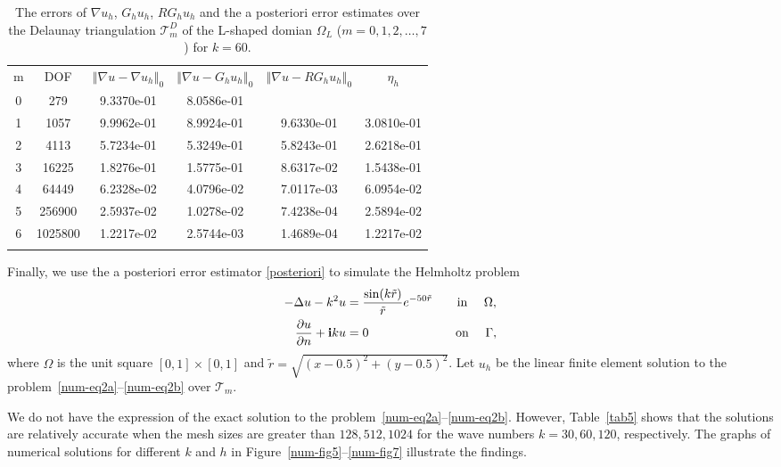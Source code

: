 \documentclass[leqno,final]{siamltex}
\numberwithin{equation}{section}
\newcommand{\norm}[1]{\left\Vert#1\right\Vert}
\newcommand{\De}{\Delta}
\newcommand{\Ga}{\Gamma}
\newcommand{\na}{\nabla}
\newcommand{\Om}{\Omega}
\newcommand{\pa}{\partial}
\renewcommand{\i}{{\rm\mathbf i}}
\newcommand{\T}{\mathcal{T}}
\newcommand{\eq}[1]{\begin{align}#1\end{align}}
\begin{document}
\begin{table}
\begin{center}
\begin{tabular}{|c|c|c|c|c|c|}
\hline\noalign{\smallskip}
m& DOF & $\norm{\na u-\na u_h}_0$ & $\norm{\na u-G_hu_h}_0$ & $\norm{\na u-RG_hu_h}_0$ & $\eta_h$\\
\noalign{\smallskip}\hline\noalign{\smallskip}
   0 &  279  & 9.3370e-01  &   8.0586e-01 &             &            \\
   1 &  1057 &  9.9962e-01 &   8.9924e-01 &  9.6330e-01 &  3.0810e-01\\
   2 &  4113 &  5.7234e-01 &   5.3249e-01 &  5.8243e-01 &  2.6218e-01\\
   3 &  16225&   1.8276e-01&   1.5775e-01 &  8.6317e-02 &  1.5438e-01\\
   4 &  64449&   6.2328e-02&   4.0796e-02 &  7.0117e-03 &  6.0954e-02\\
   5 &  256900&  2.5937e-02&   1.0278e-02 &  7.4238e-04 &  2.5894e-02\\
   6 &  1025800& 1.2217e-02&   2.5744e-03 &  1.4689e-04 &  1.2217e-02\\
\noalign{\smallskip}\hline
\end{tabular}
\caption{The errors of $\na u_h$, $G_hu_h$, $RG_hu_h$ and the a posteriori error estimates over the Delaunay triangulation $\T^D_m$ of the L-shaped domian $\Om_L$ ($m=0,1,2,\ldots,7$) for $k=60$.}
\label{tab4_Delaunay}
\end{center}
\end{table}

Finally, we use the a posteriori error estimator \eqref{posteriori} to simulate the Helmholtz problem
\eq{ -\De u - k^2 u &=\frac{\sin(k\tilde r)}{\tilde r}e^{-50\tilde r}  \qquad\mbox{in  }\quad \Om,\label{num-eq2a}\\
\frac{\pa u}{\pa n} +\i k u& =0 \quad\qquad\qquad\qquad\mbox{on }\quad \Ga,\label{num-eq2b}}
where $\Om$ is the unit square $[0,1]\times[0,1]$ and $\tilde r=\sqrt{(x-0.5)^2+(y-0.5)^2}$. Let $u_h$ be the linear finite element solution to the problem~\eqref{num-eq2a}--\eqref{num-eq2b} over $\T_m$.

We do not have the expression of the exact solution to the problem~\eqref{num-eq2a}--\eqref{num-eq2b}.  However, Table~\ref{tab5}
shows that the solutions are relatively accurate when the mesh sizes are greater than $128,512,1024$ for the wave numbers $k=30,60,120$, respectively.
The graphs of numerical solutions for different $k$ and $h$ in Figure~\ref{num-fig5}--\ref{num-fig7} illustrate the findings.
\end{document}
